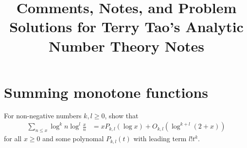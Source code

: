 \documentclass[11pt]{article}
\newenvironment{ex}[1]
  {\renewcommand\theinnercustomthm{#1}\innercustomthm}
  {\endinnercustomthm}
\begin{document}
\title{Comments, Notes, and Problem Solutions for Terry Tao's Analytic Number Theory Notes}
\date{}
\maketitle


\section{Summing monotone functions}


\begin{ex}{4}\label{four}
For non-negative numbers $k,l\geq0$, show that
\begin{align}
\sum_{n\leq x}\log^k{n}\log^l{\frac{x}{n}} &= xP_{k,l}(\log{x})+O_{k,l}(\log^{k+l}{(2+x)})\label{four_result}
\end{align}
for all $x\geq 0$ and some polynomal $P_{k,l}(t)$ with leading term $l!t^k$.
\end{ex}
\end{document}
